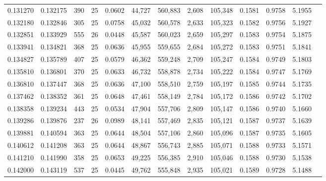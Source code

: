 \begin{tabular}{rrrrrrrrrrrrr}
0.131270 & 0.132175 &   390 &  25 &                                     0.0602 &  44,727 & 560,883 &   2,608 & 105,348 & 0.1581 & 0.9758 & 5.1955 \\
0.132180 & 0.132846 &   305 &  25 &                                     0.0758 &  45,032 & 560,578 &   2,633 & 105,323 & 0.1582 & 0.9756 & 5.1927 \\
0.132851 & 0.133929 &   555 &  26 &                                     0.0448 &  45,587 & 560,023 &   2,659 & 105,297 & 0.1583 & 0.9754 & 5.1875 \\
0.133941 & 0.134821 &   368 &  25 &                                     0.0636 &  45,955 & 559,655 &   2,684 & 105,272 & 0.1583 & 0.9751 & 5.1841 \\
0.134827 & 0.135789 &   407 &  25 &                                     0.0579 &  46,362 & 559,248 &   2,709 & 105,247 & 0.1584 & 0.9749 & 5.1803 \\
0.135810 & 0.136801 &   370 &  25 &                                     0.0633 &  46,732 & 558,878 &   2,734 & 105,222 & 0.1584 & 0.9747 & 5.1769 \\
0.136810 & 0.137447 &   368 &  25 &                                     0.0636 &  47,100 & 558,510 &   2,759 & 105,197 & 0.1585 & 0.9744 & 5.1735 \\
0.137462 & 0.138352 &   361 &  25 &                                     0.0648 &  47,461 & 558,149 &   2,784 & 105,172 & 0.1586 & 0.9742 & 5.1702 \\
0.138358 & 0.139234 &   443 &  25 &                                     0.0534 &  47,904 & 557,706 &   2,809 & 105,147 & 0.1586 & 0.9740 & 5.1660 \\
0.139286 & 0.139876 &   237 &  26 &                                     0.0989 &  48,141 & 557,469 &   2,835 & 105,121 & 0.1587 & 0.9737 & 5.1639 \\
0.139881 & 0.140594 &   363 &  25 &                                     0.0644 &  48,504 & 557,106 &   2,860 & 105,096 & 0.1587 & 0.9735 & 5.1605 \\
0.140612 & 0.141208 &   363 &  25 &                                     0.0644 &  48,867 & 556,743 &   2,885 & 105,071 & 0.1588 & 0.9733 & 5.1571 \\
0.141210 & 0.141990 &   358 &  25 &                                     0.0653 &  49,225 & 556,385 &   2,910 & 105,046 & 0.1588 & 0.9730 & 5.1538 \\
0.142000 & 0.143119 &   537 &  25 &                                     0.0445 &  49,762 & 555,848 &   2,935 & 105,021 & 0.1589 & 0.9728 & 5.1488 \\

\end{tabular}
